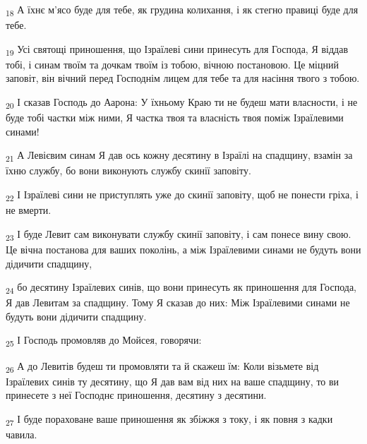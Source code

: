 \begin{tcolorbox}
\textsubscript{18} А їхнє м'ясо буде для тебе, як грудина колихання, і як стегно правиці буде для тебе.
\end{tcolorbox}
\begin{tcolorbox}
\textsubscript{19} Усі святощі приношення, що Ізраїлеві сини принесуть для Господа, Я віддав тобі, і синам твоїм та дочкам твоїм із тобою, вічною постановою. Це міцний заповіт, він вічний перед Господнім лицем для тебе та для насіння твого з тобою.
\end{tcolorbox}
\begin{tcolorbox}
\textsubscript{20} І сказав Господь до Аарона: У їхньому Краю ти не будеш мати власности, і не буде тобі частки між ними, Я частка твоя та власність твоя поміж Ізраїлевими синами!
\end{tcolorbox}
\begin{tcolorbox}
\textsubscript{21} А Левієвим синам Я дав ось кожну десятину в Ізраїлі на спадщину, взамін за їхню службу, бо вони виконують службу скинії заповіту.
\end{tcolorbox}
\begin{tcolorbox}
\textsubscript{22} І Ізраїлеві сини не приступлять уже до скинії заповіту, щоб не понести гріха, і не вмерти.
\end{tcolorbox}
\begin{tcolorbox}
\textsubscript{23} І буде Левит сам виконувати службу скинії заповіту, і сам понесе вину свою. Це вічна постанова для ваших поколінь, а між Ізраїлевими синами не будуть вони дідичити спадщину,
\end{tcolorbox}
\begin{tcolorbox}
\textsubscript{24} бо десятину Ізраїлевих синів, що вони принесуть як приношення для Господа, Я дав Левитам за спадщину. Тому Я сказав до них: Між Ізраїлевими синами не будуть вони дідичити спадщину.
\end{tcolorbox}
\begin{tcolorbox}
\textsubscript{25} І Господь промовляв до Мойсея, говорячи:
\end{tcolorbox}
\begin{tcolorbox}
\textsubscript{26} А до Левитів будеш ти промовляти та й скажеш їм: Коли візьмете від Ізраїлевих синів ту десятину, що Я дав вам від них на ваше спадщину, то ви принесете з неї Господнє приношення, десятину з десятини.
\end{tcolorbox}
\begin{tcolorbox}
\textsubscript{27} І буде пораховане ваше приношення як збіжжя з току, і як повня з кадки чавила.
\end{tcolorbox}
